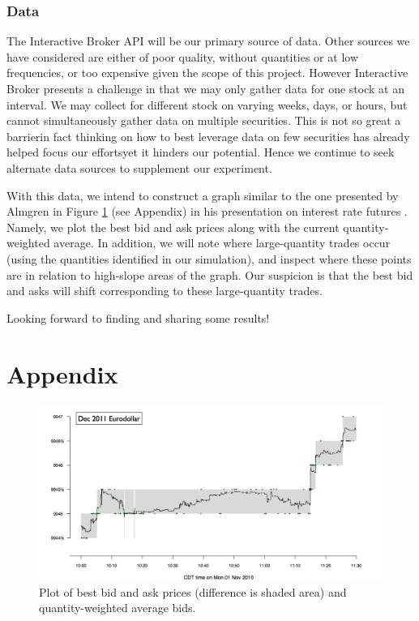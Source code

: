 \documentclass{article}
\begin{document}
\subsubsection*{Data}
The Interactive Broker API will be our primary source of data. 
Other sources we have considered are either of poor quality, without quantities or at low frequencies, or too expensive given the scope of this project.
However Interactive Broker presents a challenge in that we may only gather data for one stock at an interval. 
We may collect for different stock on varying weeks, days, or hours, but cannot simultaneously gather data on multiple securities.
This is not so great a barrier\textemdash in fact thinking on how to best leverage data on few securities has already helped focus our efforts\textemdash yet it hinders our potential.
Hence we continue to seek alternate data sources to supplement our experiment.

With this data, we intend to construct a graph similar to the one presented by Almgren in Figure \ref{fig:almgren} (see Appendix) in his presentation on interest rate futures \cite{almgren}.
Namely, we plot the best bid and ask prices along with the current quantity-weighted average.
In addition, we will note where large-quantity trades occur (using the quantities identified in our simulation), and inspect where these points are in relation to high-slope areas of the graph.
Our suspicion is that the best bid and asks will shift corresponding to these large-quantity trades.


Looking forward to finding and sharing some results!




\newpage

\section*{Appendix}

\begin{figure}[h]
\includegraphics[width=\textwidth]{almgren.png}
\caption{Plot of best bid and ask prices (difference is shaded area) and quantity-weighted average bids.}
\label{fig:almgren}
\end{figure}
\end{document}
